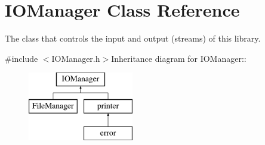 \hypertarget{classJKBuilder_1_1IOManager}{
\section{IOManager Class Reference}
\label{classJKBuilder_1_1IOManager}
}


The class that controls the input and output (streams) of this library.  


{\ttfamily \#include $<$IOManager.h$>$}Inheritance diagram for IOManager::\begin{figure}[H]
\begin{center}
\leavevmode
\includegraphics[height=3cm]{classJKBuilder_1_1IOManager}
\end{center}
\end{figure}
